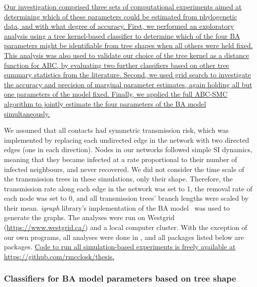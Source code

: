 {\color{blue}\uline{Our investigation comprised three sets of computational
experiments aimed at determining which of these parameters could be estimated
from phylogenetic data, and with what degree of accuracy. First, we performed
an exploratory analysis using a tree kernel-based classifier to determine which
of the four \gls{BA} parameters might be identifiable from tree shapes when all
others were held fixed. This analysis was also used to validate our choice of
the tree kernel as a distance function for \gls{ABC}, by evaluating two further
classifiers based on other tree summary statistics from the literature. Second,
we used grid search to investigate the accuracy and precision of marginal
parameter estimates, again holding all but one parameters of the model fixed.
Finally, we applied the full \gls{ABC}-\gls{SMC} algorithm to jointly estimate
the four parameters of the \gls{BA} model simultaneously.}}

We assumed that all contacts had symmetric transmission risk, which was
implemented by replacing each undirected edge in the network with two directed
edges (one in each direction). Nodes in our networks followed simple \gls{SI}
dynamics, meaning that they became infected at a rate proportional to their
number of infected neighbours, and never recovered. We did not consider the
time scale of the transmission trees in these simulations, only their shape.
Therefore, the transmission rate along each edge in the network was set to 1,
the removal rate of each node was set to 0, and all transmission trees' branch
lengths were scaled by their mean. \textit{igraph} library's implementation of
the BA model~\autocite{csardi2006igraph} was used to generate the graphs. The
analyses were run on Westgrid (\url{https://www.westgrid.ca/}) and a local
computer cluster. With the exception of our own programs, all analyses were
done in , and all packages listed below are  packages.
{\color{blue}\uline{Code to run all simulation-based experiments is freely
available at \url{https://github.com/rmcclosk/thesis}.}}

\subsubsection*{Classifiers for BA model parameters based on tree shape}
\label{subsec:kernel}


